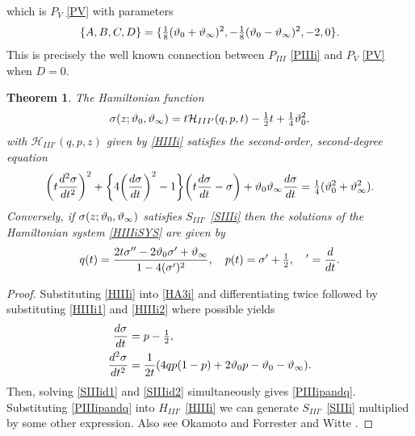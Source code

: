 \documentclass[12pt]{article}
\newtheorem{mydef}{Theorem}[section]
\numberwithin{figure}{section}
\numberwithin{equation}{section}
\numberwithin{table}{section}
\begin{document}
which is $P_V$ \eqref{PV} with parameters $$\{A,B,C,D\}=\{\tfrac{1}{8}(\vartheta_0+\vartheta_\infty)^2,-\tfrac{1}{8}(\vartheta_0-\vartheta_\infty)^2,-2,0\}.$$
This is precisely the well known connection between $P_{III}$ \eqref{PIIIi} and $P_V$ \eqref{PV} when $D=0$.
\begin{mydef} The Hamiltonian function
\begin{equation}
\sigma(z;\vartheta_0,\vartheta_\infty)=t\mathcal{H}_{III'}(q,p,t)-\tfrac{1}{2}t+\tfrac{1}{4}\vartheta_0^2,\label{HA3i}
\end{equation}
with $\mathcal{H}_{III'}(q,p,z)$ given by \eqref{HIIIi} satisfies the second-order, second-degree equation
\begin{equation}
\bigg(t\frac{d^2\sigma}{dt^2}\bigg)^2+\bigg\{4\bigg(\frac{d\sigma}{dt}\bigg)^2-1\bigg\}\bigg(t\frac{d\sigma}{dt}-\sigma\bigg)+\vartheta_0\vartheta_\infty\frac{d\sigma}{dt}=\tfrac{1}{4}(\vartheta_0^2+\vartheta_\infty^2).\label{SIIIi}
\end{equation}
Conversely, if $\sigma(z;
\vartheta_0,\vartheta_\infty)$ satisfies $S_{III'}$ \eqref{SIIIi} then the solutions of the Hamiltonian system \eqref{HIIIiSYS} are given by
\begin{equation}\label{PIIIipandq}
q(t)=\frac { 2t\sigma''-2\vartheta_0\sigma'+\vartheta_\infty}{1-4(\sigma')^2},\quad
p(t)=\sigma'+\tfrac{1}{2},\quad'=\frac{d}{dt}.
\end{equation}
\end{mydef}
\begin{proof}
Substituting \eqref{HIIIi} into \eqref{HA3i} and differentiating twice followed by substituting \eqref{HIIIi1} and \eqref{HIIIi2} where possible yields
\begin{subequations}
\begin{align}
\frac{d\sigma}{dt}&=p-\tfrac{1}{2},\label{SIIIid1}\\
\frac{d^2\sigma}{dt^2}&=\frac{1}{2t}(4qp(1-p)+2\vartheta_0p-\vartheta_0-\vartheta_\infty).\label{SIIIid2}
\end{align}
\end{subequations}
Then, solving \eqref{SIIIid1} and \eqref{SIIIid2} simultaneously gives \eqref{PIIIipandq}.
Substituting \eqref{PIIIipandq} into $H_{III'}$ \eqref{HIIIi} we can generate $S_{III'}$ \eqref{SIIIi} multiplied by some other expression.
Also see Okamoto \cite{P:56:367,P:30:305} and Forrester and Witte \cite{P:219:357}.
\end{proof}
\end{document}
